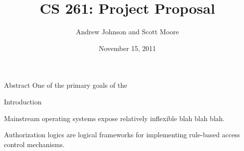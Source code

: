 \documentclass[10pt]{article}
\begin{document}
\title{CS 261: Project Proposal}
\author{Andrew Johnson and Scott Moore}
\date{November 15, 2011}

\maketitle

\thispagestyle{empty}

\begin{section}{Abstract}
One of the primary goals of the 
\end{section}

\begin{section}{Introduction}

Mainstream operating systems expose relatively inflexible blah blah blah.

Authorization logics are logical frameworks for implementing rule-based access control mechanisms.



\end{section}
\end{document}
